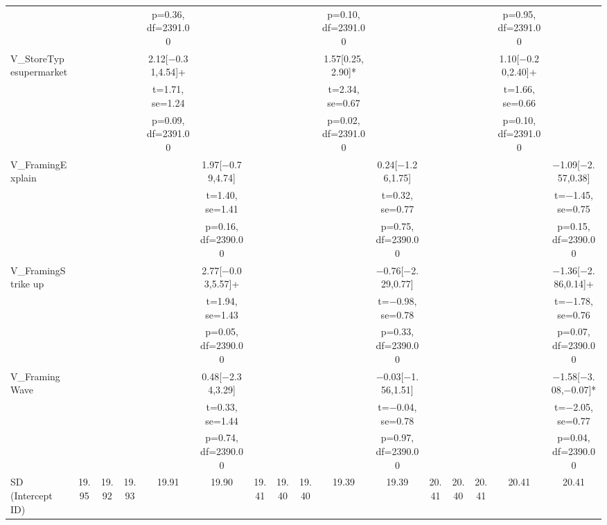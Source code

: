 \documentclass[]{report}
\begin{document}
\begin{table}
{\begin{tabular}[t]{lccccccccccccccc}
		&  &  &  & p=\num{0.36}, df=\num{2391.00} &  &  &  &  & p=\num{0.10}, df=\num{2391.00} &  &  &  &  & p=\num{0.95}, df=\num{2391.00} & \\
		V\_StoreTypesupermarket &  &  &  & \num{2.12}[\num{-0.31},\num{4.54}]+ &  &  &  &  & \num{1.57}[\num{0.25},\num{2.90}]* &  &  &  &  & \num{1.10}[\num{-0.20},\num{2.40}]+ & \\
		&  &  &  & t=\num{1.71}, se=\num{1.24} &  &  &  &  & t=\num{2.34}, se=\num{0.67} &  &  &  &  & t=\num{1.66}, se=\num{0.66} & \\
		&  &  &  & p=\num{0.09}, df=\num{2391.00} &  &  &  &  & p=\num{0.02}, df=\num{2391.00} &  &  &  &  & p=\num{0.10}, df=\num{2391.00} & \\
		V\_FramingExplain &  &  &  &  & \num{1.97}[\num{-0.79},\num{4.74}] &  &  &  &  & \num{0.24}[\num{-1.26},\num{1.75}] &  &  &  &  & \num{-1.09}[\num{-2.57},\num{0.38}]\\
		&  &  &  &  & t=\num{1.40}, se=\num{1.41} &  &  &  &  & t=\num{0.32}, se=\num{0.77} &  &  &  &  & t=\num{-1.45}, se=\num{0.75}\\
		&  &  &  &  & p=\num{0.16}, df=\num{2390.00} &  &  &  &  & p=\num{0.75}, df=\num{2390.00} &  &  &  &  & p=\num{0.15}, df=\num{2390.00}\\
		V\_FramingStrike up &  &  &  &  & \num{2.77}[\num{-0.03},\num{5.57}]+ &  &  &  &  & \num{-0.76}[\num{-2.29},\num{0.77}] &  &  &  &  & \num{-1.36}[\num{-2.86},\num{0.14}]+\\
		&  &  &  &  & t=\num{1.94}, se=\num{1.43} &  &  &  &  & t=\num{-0.98}, se=\num{0.78} &  &  &  &  & t=\num{-1.78}, se=\num{0.76}\\
		&  &  &  &  & p=\num{0.05}, df=\num{2390.00} &  &  &  &  & p=\num{0.33}, df=\num{2390.00} &  &  &  &  & p=\num{0.07}, df=\num{2390.00}\\
		V\_FramingWave &  &  &  &  & \num{0.48}[\num{-2.34},\num{3.29}] &  &  &  &  & \num{-0.03}[\num{-1.56},\num{1.51}] &  &  &  &  & \num{-1.58}[\num{-3.08},\num{-0.07}]*\\
		&  &  &  &  & t=\num{0.33}, se=\num{1.44} &  &  &  &  & t=\num{-0.04}, se=\num{0.78} &  &  &  &  & t=\num{-2.05}, se=\num{0.77}\\
		&  &  &  &  & p=\num{0.74}, df=\num{2390.00} &  &  &  &  & p=\num{0.97}, df=\num{2390.00} &  &  &  &  & p=\num{0.04}, df=\num{2390.00}\\
		SD (Intercept ID) & \num{19.95} & \num{19.92} & \num{19.93} & \num{19.91} & \num{19.90} & \num{19.41} & \num{19.40} & \num{19.40} & \num{19.39} & \num{19.39} & \num{20.41} & \num{20.40} & \num{20.41} & \num{20.41} & \num{20.41}\\

\end{tabular}}
\end{table}
\end{document}
